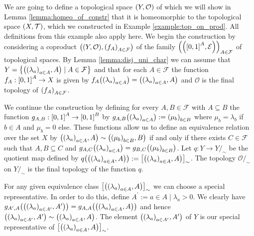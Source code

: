 \begin{example}\label{example:homeo_to_prod}
	 We are going to define a topological space $\tspace[Y][O]$ of which we will show in Lemma \ref{lemma:homeo_of_constr} that it is homeomorphic to the topological space $\tspace$, which we constructed in Example \ref{example:top_on_prod}. All definitions from this example also apply here. We begin the construction by considering a coproduct $\pbraces{\tspace[Y][O], \pbraces{f_A}_{A \in \mathcal{F}}}$ of the family $\pbraces{\eucl[\bbraces{0,1}^A]}_{A \in \mathcal{F}}$ of topological spaces. By Lemma \ref{lemma:disj_uni_char} we can assume  that $Y = \Bbraces{\pbraces{\pbraces{\lambda_a}_{a \in A}, A} \mid A \in \mathcal{F}}$ and that for each $A \in \mathcal{F}$ the function $f_A: \bbraces{0,1}^A \to X$ is given by $f_A\pbraces{\pbraces{\lambda_a}_{a \in A}} = \pbraces{\pbraces{\lambda_a}_{a \in A}, A}$ and $\mathcal{O}$ is the final topology of $\pbraces{f_A}_{A \in \mathcal{F}}$. 

	We continue the construction by defining for every $A,B \in \mathcal{F}$ with $A \subseteq B$ the function $g_{A,B}: \bbraces{0,1}^A \to \bbraces{0,1}^B$ by $g_{A,B}\pbraces{\pbraces{\lambda_a}_{a \in A}} := \pbraces{\mu_b}_{b \in B}$ where $\mu_b = \lambda_b$ if $b \in A$ and $\mu_b = 0$ else. These functions allow us to define an equivalence relation over the set $X$ by $\pbraces{\pbraces{\lambda_a}_{a \in A}, A} \sim \pbraces{\pbraces{\mu_b}_{b \in B}, B}$ if and only if there exists $C \in \mathcal{F}$ such that $A, B \subseteq C$ and  $g_{A,C}\pbraces{\pbraces{\lambda_a}_{a \in A}} = g_{B,C}\pbraces{\pbraces{\mu_b}_{b \in B}}$. Let $q: Y \to Y/_\sim$ be the quotient map defined by $q\pbraces{\pbraces{\pbraces{\lambda_a}_{a \in A}, A}} := \bbraces{\pbraces{\pbraces{\lambda_a}_{a \in A}, A}}_\sim$. The topology $\mathcal{O}/_\sim$ on $Y/_\sim$ is the final topology of the function $q$.
	
	For any given equivalence class $\bbraces{\pbraces{\pbraces{\lambda_a}_{a \in A}, A}}_\sim$ we can choose a special representative. In order to do this, define $A^\prime := {a \in A \mid \lambda_a > 0}$. We clearly have $g_{A^\prime, A}\pbraces{\pbraces{\pbraces{\lambda_a}_{a \in A^\prime}, A^\prime}} = g_{A,A}\pbraces{\pbraces{\pbraces{\lambda_a}_{a \in A}, A}}$ and hence $\pbraces{\pbraces{\lambda_a}_{a \in A^\prime}, A^\prime} \sim \pbraces{\pbraces{\lambda_a}_{a \in A}, A}$. The element $\pbraces{\pbraces{\lambda_a}_{a \in A^\prime}, A^\prime}$ of $Y$ is our special representative of $\bbraces{\pbraces{\pbraces{\lambda_a}_{a \in A}, A}}_\sim$. 
\end{example}

